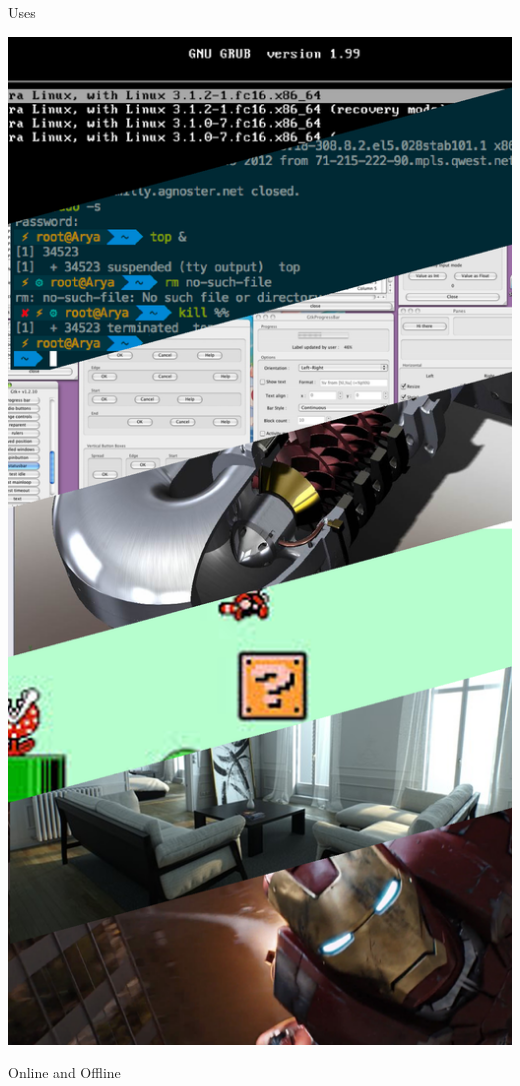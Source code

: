 \documentclass{lug}
\newcommand{\pmidg}[1]{\parbox{\widthof{#1}}{#1}}
\begin{document}
\begin{frame}{Uses}
\begin{minipage}{.35\textwidth}
        \pmidg{\includegraphics[width=\textwidth]{graphics/uses}}
    \end{minipage}
\end{frame}

\begin{frame}{Online and Offline}
\end{frame}
\end{document}
